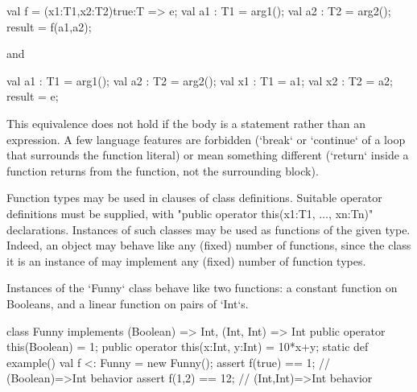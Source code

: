\begin{xten}
{
  val f = (x1:T1,x2:T2){true}:T => e;
  val a1 : T1 = arg1();
  val a2 : T2 = arg2();
  result = f(a1,a2);
}
\end{xten}
and 
\begin{xten}
{
  val a1 : T1 = arg1();
  val a2 : T2 = arg2();
  {
     val x1 : T1 = a1;
     val x2 : T2 = a2;
     result = e;
  }  
}
\end{xten}
\noindent
This equivalence does not hold if the body is a statement rather than an expression.
A few language features are forbidden (\xcd`break` or \xcd`continue` of a loop
that surrounds the function literal) or mean something different (\xcd`return`
inside a function returns from the function, not the surrounding block). 



Function types may be used in  clauses of class
definitions. Suitable operator definitions must be supplied, with 
\xcdmath"public operator this(x1:T1, $\ldots$, xn:Tn)" declarations.
Instances of such classes may be used as functions of the
given type.  Indeed, an object may behave like any (fixed) number of
functions, since the class it is an instance of may implement any
(fixed) number of function types.
\begin{eg}
Instances of the \xcd`Funny` class behave like two functions: 
a constant function on Booleans, and a linear function on 
pairs of \xcd`Int`s.  
\begin{xten}
class Funny implements (Boolean) => Int, 
                       (Int, Int) => Int
{
  public operator this(Boolean) = 1;
  public operator this(x:Int, y:Int) = 10*x+y;
  static def example() {
    val f <: Funny  = new Funny();
    assert f(true) == 1; // (Boolean)=>Int behavior
    assert f(1,2) == 12; // (Int,Int)=>Int behavior
  }
}
\end{xten}

\end{eg}


